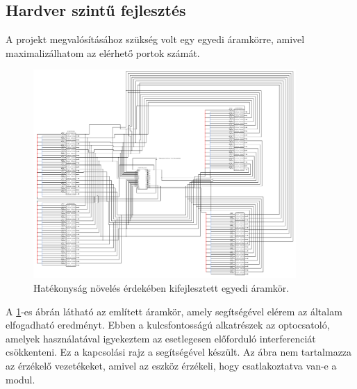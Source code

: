 \documentclass{thesis-ekf}
\theoremstyle{definition}
\theoremstyle{remark}
\begin{document}
	\subsection{Hardver szintű fejlesztés}
	A projekt megvalósításához szükség volt egy egyedi áramkörre, amivel maximalizálhatom az elérhető portok számát.
	\begin{figure}[!ht]
		\centering
		\includegraphics[width=10cm]{circuit}
		\caption{Hatékonyság növelés érdekében kifejlesztett egyedi áramkör.}
		\label{img_circ}
	\end{figure}
	A \ref{img_circ}-es ábrán látható az említett áramkör, amely segítségével elérem az általam elfogadható eredményt. Ebben a kulcsfontosságú alkatrészek az optocsatoló, amelyek használatával igyekeztem  az esetlegesen előforduló interferenciát csökkenteni.
	Ez a kapcsolási rajz a \href{https://www.circuit-diagram.org/}{\color{blue}{Circuit Diagram}} segítségével készült.
	Az ábra nem tartalmazza az érzékelő vezetékeket, amivel az eszköz érzékeli, hogy csatlakoztatva van-e a modul.
\end{document}

